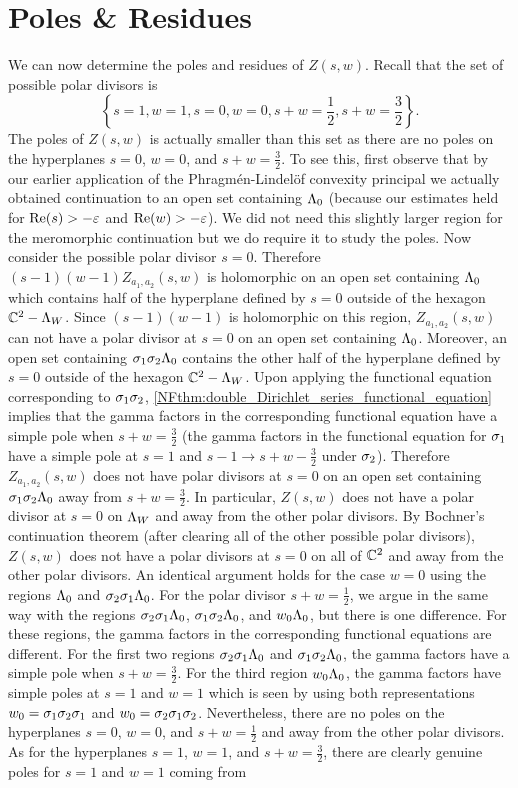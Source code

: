 \section{Poles \& Residues}
    We can now determine the poles and residues of $Z(s,w)$. Recall that the set of possible polar divisors is
    \[
        \left\{s = 1, w = 1, s = 0, w = 0, s+w = \frac{1}{2}, s+w = \frac{3}{2}\right\}.
    \]
    The poles of $Z(s,w)$ is actually smaller than this set as there are no poles on the hyperplanes $s = 0$, $w = 0$, and $s+w = \frac{3}{2}$. To see this, first observe that by our earlier application of the Phragm\'en-Lindel\"of convexity principal we actually obtained continuation to an open set containing $\Lambda_{0}$ (because our estimates held for $\mathrm{Re}(s) > -\varepsilon$ and $\mathrm{Re}(w) > -\varepsilon$). We did not need this slightly larger region for the meromorphic continuation but we do require it to study the poles. Now consider the possible polar divisor $s = 0$. Therefore $(s-1)(w-1)Z_{a_{1},a_{2}}(s,w)$ is holomorphic on an open set containing $\Lambda_{0}$ which contains half of the hyperplane defined by $s = 0$ outside of the hexagon $\mathbb{C}^{2}-\Lambda_{W}$. Since $(s-1)(w-1)$ is holomorphic on this region, $Z_{a_{1},a_{2}}(s,w)$ can not have a polar divisor at $s = 0$ on an open set containing $\Lambda_{0}$. Moreover, an open set containing $\sigma_{1}\sigma_{2}\Lambda_{0}$ contains the other half of the hyperplane defined by $s = 0$ outside of the hexagon $\mathbb{C}^{2}-\Lambda_{W}$. Upon applying the functional equation corresponding to $\sigma_{1}\sigma_{2}$, \cref{NFthm:double_Dirichlet_series_functional_equation} implies that the gamma factors in the corresponding functional equation have a simple pole when $s+w = \frac{3}{2}$ (the gamma factors in the functional equation for $\sigma_{1}$ have a simple pole at $s = 1$ and $s-1 \to s+w-\frac{3}{2}$ under $\sigma_{2}$). Therefore $Z_{a_{1},a_{2}}(s,w)$ does not have polar divisors at $s = 0$ on an open set containing $\sigma_{1}\sigma_{2}\Lambda_{0}$ away from $s+w = \frac{3}{2}$. In particular, $Z(s,w)$ does not have a polar divisor at $s = 0$ on $\Lambda_{W}$ and away from the other polar divisors. By Bochner's continuation theorem (after clearing all of the other possible polar divisors), $Z(s,w)$ does not have a polar divisors at $s = 0$ on all of $\mathbb{C}^{2}$ and away from the other polar divisors. An identical argument holds for the case $w = 0$ using the regions $\Lambda_{0}$ and $\sigma_{2}\sigma_{1}\Lambda_{0}$. For the polar divisor $s+w = \frac{1}{2}$, we argue in the same way with the regions $\sigma_{2}\sigma_{1}\Lambda_{0}$, $\sigma_{1}\sigma_{2}\Lambda_{0}$, and $w_{0}\Lambda_{0}$, but there is one difference. For these regions, the gamma factors in the corresponding functional equations are different. For the first two regions $\sigma_{2}\sigma_{1}\Lambda_{0}$ and $\sigma_{1}\sigma_{2}\Lambda_{0}$, the gamma factors have a simple pole when $s+w = \frac{3}{2}$. For the third region $w_{0}\Lambda_{0}$, the gamma factors have simple poles at $s = 1$ and $w = 1$ which is seen by using both representations $w_{0} = \sigma_{1}\sigma_{2}\sigma_{1}$ and $w_{0} = \sigma_{2}\sigma_{1}\sigma_{2}$. Nevertheless, there are no poles on the hyperplanes $s = 0$, $w = 0$, and $s+w = \frac{1}{2}$ and away from the other polar divisors. As for the hyperplanes $s = 1$, $w = 1$, and $s+w = \frac{3}{2}$, there are clearly genuine poles for $s = 1$ and $w = 1$ coming from 